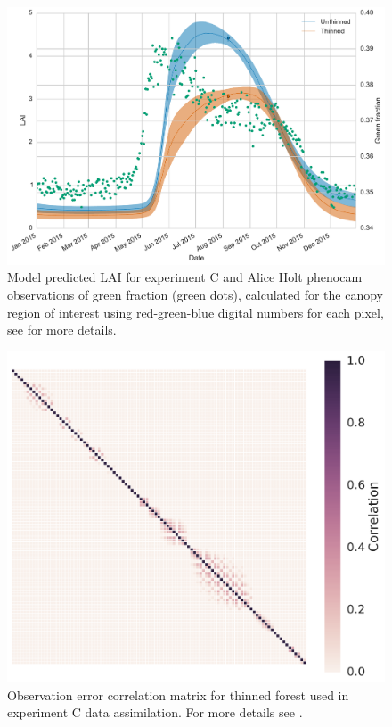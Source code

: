 \documentclass[draft,jgrga]{agutexSI}
\begin{document}
\begin{figure}[ht]
 \noindent\includegraphics[width=40pc]{pheno_lai.pdf}
    \caption{Model predicted LAI for experiment C and Alice Holt phenocam observations of green fraction (green dots), calculated for the canopy region of interest using red-green-blue digital numbers for each pixel, see \citet{mizunuma2013relationship} for more details.} \label{fig:pheno_obs}
\end{figure}


\begin{figure}[ht]
 \noindent\includegraphics[width=30pc]{rmat_eastc.pdf}
    \caption{Observation error correlation matrix for thinned forest used in experiment C data assimilation. For more details see \citet{Pinnington2016299}.} \label{fig:rmat_ut}
\end{figure}
\end{document}
